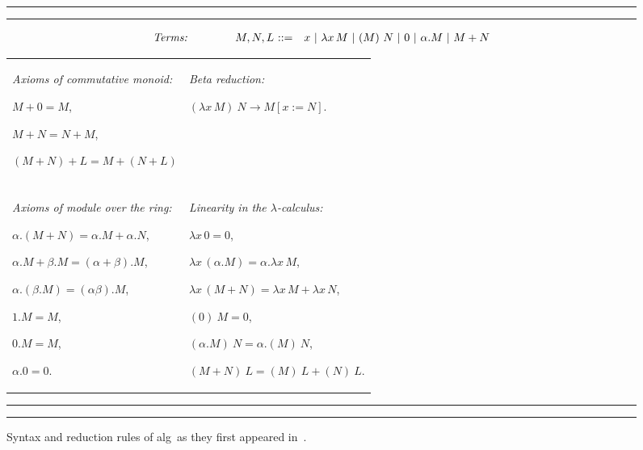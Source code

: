 \documentclass{LMCS}
\newcommand{\oalg}{\mbox{\sc alg}}
\begin{document}
\begin{figure}
  {
    \hrule\vspace{1pt}\hrule
    $$\begin{array}[t]{l@{\hspace{1.5cm}}r@{\ ::=\quad}l}
      \textrm{\itshape Terms:} & M,N,L & x\ |\ \lambda x\,M\ |\ (M)~N\ |\ 0\ |\ \alpha.M\ |\ M+N\\
    \end{array}$$
    \begin{tabular}{p{5.6cm}p{5.6cm}} \noindent \emph{Axioms of commutative monoid:}

      \noindent $M+0 = M$,

      \noindent $M+N = N+M$,

      \noindent $(M+N)+L = M+(N+L)$
      &
      \noindent \emph{Beta reduction:}

      \noindent $(\lambda x\,M)~N\to M[x:=N]$.
      \\
      &\\
      \noindent \emph{Axioms of module over the ring:}

      \noindent $\alpha.(M+N) = \alpha.M+\alpha.N$,

      \noindent $\alpha.M+\beta.M = (\alpha+\beta).M$,

      \noindent $\alpha.(\beta.M) = (\alpha\beta).M$,

      \noindent $1.M = M$,

      \noindent $0.M = M$,

      \noindent $\alpha.0 = 0$.
      &
      \emph{Linearity in the $\lambda$-calculus:}

      \noindent $\lambda x\,0 = 0$,

      \noindent $\lambda x\,(\alpha.M) = \alpha.\lambda x\,M$,

      \noindent $\lambda x\,(M+N) = \lambda x\,M+\lambda x\,N$,

      \noindent $(0)~M = 0$,

      \noindent $(\alpha.M)~N = \alpha.(M)~N$,

      \noindent $(M+N)~L = (M)~L+(N)~L$.
    \end{tabular}
  }
  \medskip

  \hrule\vspace{1pt}\hrule
  \caption{Syntax and reduction rules of \oalg\ as they first appeared in~\cite{VauxMSCS09}.}
  \label{fig:oalg}
\end{figure}
\end{document}
